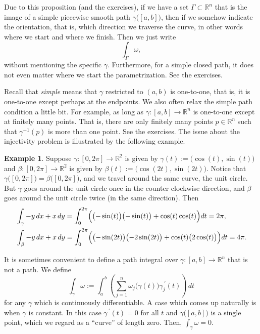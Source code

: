 \documentclass[12pt]{book}
\newcommand{\R}{{\mathbb{R}}}
\theoremstyle{plain}
\theoremstyle{remark}
\theoremstyle{definition}
\theoremstyle{exercise}
\theoremstyle{example}
\newtheorem{example}[thm]{Example}
\begin{document}
Due to this proposition (and the exercises), if we have a set $\Gamma
\subset \R^n$ that is the image of a simple piecewise smooth path
$\gamma\bigl([a,b]\bigr)$, then if we somehow indicate the orientation, that
is, which direction we traverse the curve, in other words where we start and
where we finish. Then we just write
\begin{equation*}
\int_{\Gamma} \omega ,
\end{equation*}
without mentioning the specific $\gamma$.
Furthermore, for a simple closed path, it does not even matter where we
start the parametrization.  See the exercises.

Recall that \emph{simple} means that $\gamma$ restricted to $(a,b)$ is
one-to-one, that is, it is one-to-one except perhaps at the endpoints.
We also often relax the simple path condition a little bit.
For example, as long as
$\gamma \colon [a,b] \to \R^n$ is one-to-one except at finitely many points.  That
is, there are only finitely many points $p \in \R^n$ such that
$\gamma^{-1}(p)$ is more than one point.  See the exercises.  The issue about the
injectivity
problem is illustrated by the following example.

\begin{example}
Suppose $\gamma \colon [0,2\pi] \to \R^2$ is given by $\gamma(t) :=
\bigl(\cos(t),\sin(t)\bigr)$ and
$\beta \colon [0,2\pi] \to \R^2$ is given by $\beta(t) :=
\bigl(\cos(2t),\sin(2t)\bigr)$.  Notice that
$\gamma\bigl([0,2\pi]\bigr) = \beta\bigl([0,2\pi]\bigr)$, and we travel
around the same curve, the unit circle.  But $\gamma$ goes around the unit
circle once in the counter clockwise direction, and $\beta$ goes around the
unit circle twice (in the same direction).  Then
\begin{align*}
& \int_{\gamma} -y\, dx + x\,dy
=
\int_0^{2\pi}
\Bigl( \bigl(-\sin(t) \bigr) \bigl(-\sin(t) \bigr) + \cos(t) \cos(t) \Bigr) dt
=
2 \pi,\\
& \int_{\beta} -y\, dx + x\,dy
=
\int_0^{2\pi}
\Bigl( \bigl(-\sin(2t) \bigr) \bigl(-2\sin(2t) \bigr) + \cos(t)
\bigl(2\cos(t)\bigr) \Bigr) dt
=
4 \pi.
\end{align*}
\end{example}

It is sometimes convenient to define a path integral over $\gamma \colon
[a,b] \to \R^n$ that is not a path.
We define
\begin{equation*}
\int_{\gamma} \omega := \int_a^b
\left(
\sum_{j=1}^n
\omega_j\bigl(\gamma(t)\bigr) \gamma_j^{\:\prime}(t)
\right) \, dt 
\end{equation*}
for any $\gamma$ which is continuously differentiable.  A 
case which comes up naturally is when $\gamma$ is constant.  In this case
$\gamma^{\:\prime}(t) = 0$ for all $t$ and $\gamma\bigl([a,b]\bigr)$ is a single
point, which we regard as a ``curve'' of length zero.  Then,
$\int_{\gamma} \omega = 0$.
\end{document}
